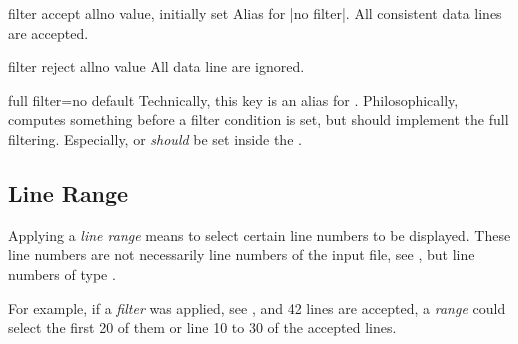 \documentclass[a4paper,11pt]{ltxdoc}
\begin{document}
\begin{docCsvKey}{filter accept all}{}{no value, initially set}
  Alias for |no filter|. All consistent data lines are accepted.
\end{docCsvKey}


\begin{docCsvKey}{filter reject all}{}{no value}
  All data line are ignored.
\end{docCsvKey}


\begin{docCsvKey}[][doc new=2016-07-01]{full filter}{=}{no default}
  Technically, this key is an alias for .
  Philosophically,  computes something before
  a filter condition is set, but  should implement
  the full filtering. Especially,  or
   \emph{should} be set inside the .
\begin{dispExample}
\end{dispExample}
\end{docCsvKey}




\clearpage
\subsection{Line Range}\label{subsec:linerange}

Applying a \emph{line range} means to select certain line numbers to be
displayed. These line numbers are not necessarily line numbers of
the input file, see , but line numbers of
type .

For example, if a \emph{filter} was applied, see ,
and 42 lines are accepted, a \emph{range} could select the first 20 of them or
line 10 to 30 of the accepted lines.
\end{document}

